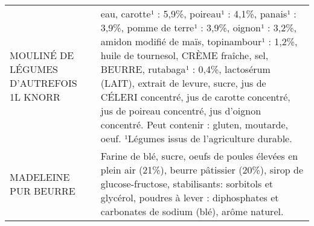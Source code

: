 \begin{longtable}{p{5cm}p{10cm}}
                                                                  MOULINÉ DE LÉGUMES D'AUTREFOIS 1L KNORR &                                                                                                                                                                                                                                                                                                                                                                                                                                                                                                                                                                                        eau, carotte¹ : 5,9\%, poireau¹ : 4,1\%, panais¹ : 3,9\%, pomme de terre¹ : 3,9\%, oignon¹ : 3,2\%, amidon modifié de maïs, topinambour¹ : 1,2\%, huile de tournesol, CRÈME fraîche, sel, BEURRE, rutabaga¹ : 0,4\%, lactosérum (LAIT), extrait de levure, sucre, jus de CÉLERI concentré, jus de carotte concentré, jus de poireau concentré, jus d'oignon concentré. Peut contenir : gluten, moutarde, oeuf.  ¹Légumes issus de l'agriculture durable. \\
                                                                                     MADELEINE PUR BEURRE &                                                                                                                                                                                                                                                                                                                                                                                                                                                                                                                                                                                                                                                                                                                                                                                                   Farine de blé, sucre, oeufs de poules élevées en plein air (21\%), beurre pâtissier (20\%), sirop de glucose-fructose, stabilisants: sorbitols et glycérol, poudres à lever : diphosphates et carbonates de sodium (blé), arôme naturel. \\

\end{longtable}
